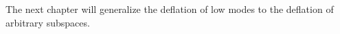 The next chapter will generalize the deflation of low modes to the deflation of arbitrary subspaces.



